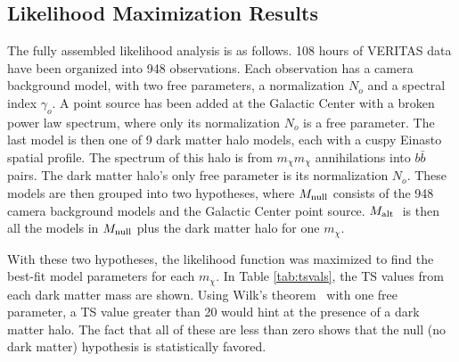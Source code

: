   \subsection{Likelihood Maximization Results}\label{like_results}

  The fully assembled likelihood analysis is as follows.
  108 hours of VERITAS data have been organized into 948 observations.
  Each observation has a camera background model, with two free parameters, a normalization $N_o$ and a spectral index $\gamma_o$.
  A point source has been added at the Galactic Center with a broken power law spectrum, where only its normalization $N_o$ is a free parameter.
  The last model is then one of 9 dark matter halo models, each with a cuspy Einasto spatial profile.
  The spectrum of this halo is from $m_{\chi}m_{\chi}$ annihilations into $b\bar{b}$ pairs.
  The dark matter halo's only free parameter is its normalization $N_o$.
  These models are then grouped into two hypotheses, where $M_\textrm{null}$ consists of the 948 camera background models and the Galactic Center point source.
  $M_\textrm{alt }$ is then all the models in $M_\textrm{null}$ plus the dark matter halo for one $m_{\chi}$.
  
  With these two hypotheses, the likelihood function was maximized to find the best-fit model parameters for each $m_{\chi}$.
  In Table \ref{tab:tsvals}, the TS values from each dark matter mass are shown.
  Using Wilk's theorem~\cite{wilks1938} with one free parameter, a TS value greater than 20 would hint at the presence of a dark matter halo.
  The fact that all of these are less than zero shows that the null (no dark matter) hypothesis is statistically favored.


